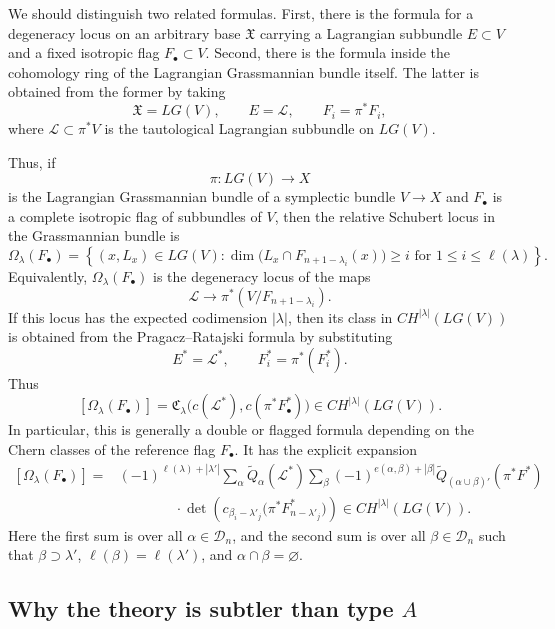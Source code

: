 \documentclass[12pt]{article}
\begin{document}
We should distinguish two related formulas. First, there is the formula for a degeneracy locus on an arbitrary base $\mathfrak X$ carrying a Lagrangian subbundle $E\subset V$ and a fixed isotropic flag $F_\bullet\subset V$. Second, there is the formula inside the cohomology ring of the Lagrangian Grassmannian bundle itself. The latter is obtained from the former by taking
\[
    \mathfrak X=LG(V),
    \qquad
    E=\mathcal L,
    \qquad
    F_i=\pi^*F_i,
\]
where $\mathcal L\subset \pi^*V$ is the tautological Lagrangian subbundle on $LG(V)$.

Thus, if
\[
    \pi:LG(V)\to X
\]
is the Lagrangian Grassmannian bundle of a symplectic bundle $V\to X$ and
$F_\bullet$ is a complete isotropic flag of subbundles of $V$, then the relative Schubert locus in the Grassmannian bundle is
\[
    \Omega_\lambda(F_\bullet)
    =
    \left\{
    (x,L_x)\in LG(V):
    \dim\bigl(L_x\cap F_{n+1-\lambda_i}(x)\bigr)\ge i
    \text{ for }1\le i\le \ell(\lambda)
    \right\}.
\]
Equivalently, $\Omega_\lambda(F_\bullet)$ is the degeneracy locus of the maps
\[
    \mathcal L
    \longrightarrow
    \pi^*(V/F_{n+1-\lambda_i}).
\]
If this locus has the expected codimension $|\lambda|$, then its class in
$CH^{|\lambda|}(LG(V))$ is obtained from the Pragacz--Ratajski formula by substituting
\[
    E^*=\mathcal L^*,
    \qquad
    F_i^*=\pi^*(F_i^*).
\]
Thus
\[
    [\Omega_\lambda(F_\bullet)]
    =
    \mathfrak C_\lambda\bigl(c(\mathcal L^*),c(\pi^*F_\bullet^*)\bigr)
    \in CH^{|\lambda|}(LG(V)).
\]
In particular, this is generally a double or flagged formula depending on the Chern classes of the reference flag $F_\bullet$. It has the explicit expansion
\[
\begin{aligned}
    [\Omega_\lambda(F_\bullet)]
    ={}&
    (-1)^{\ell(\lambda)+|\lambda'|}
    \sum_\alpha \widetilde Q_\alpha(\mathcal L^*)
    \sum_\beta
    (-1)^{e(\alpha,\beta)+|\beta|}
    \widetilde Q_{(\alpha\cup\beta)'}(\pi^*F^*) \\
    &\qquad\qquad\cdot
    \det\left(
        c_{\beta_i-\lambda'_j}
        \bigl(\pi^*F_{n-\lambda'_j}^*\bigr)
    \right)
    \in CH^{|\lambda|}(LG(V)).
\end{aligned}
\]
Here the first sum is over all $\alpha\in \mathcal D_n$, and the second sum is over all $\beta\in \mathcal D_n$ such that $\beta\supset \lambda'$, $\ell(\beta)=\ell(\lambda')$, and $\alpha\cap\beta=\varnothing$. 

\subsection{Why the theory is subtler than type $A$}
\end{document}

